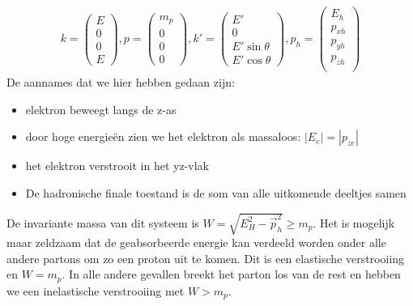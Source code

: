 \documentclass[../main.tex]{subfiles}
\begin{document}
\begin{equation}
    \begin{aligned}
        \label{eq:4_momenta_dis}
        k=
        \begin{pmatrix}
            E\\
            0\\
            0\\
            E
        \end{pmatrix},
        p=
        \begin{pmatrix}
            m_p\\
            0\\
            0\\
            0
        \end{pmatrix},
        k'=
        \begin{pmatrix}
            E'\\
            0\\
            E'\sin\theta\\
            E'\cos\theta
        \end{pmatrix},
        p_h=
        \begin{pmatrix}
            E_h\\
            p_{xh}\\
            p_{yh}\\
            p_{zh}\\
        \end{pmatrix}
    \end{aligned}
\end{equation}
De aannames dat we hier hebben gedaan zijn:
\begin{itemize}
    \item elektron beweegt langs de z-as
    \item door hoge energieën zien we het elektron als massaloos: $|E_e|=|p_{ze}|$
    \item het elektron verstrooit in het yz-vlak
    \item De hadronische finale toestand is de som van alle uitkomende deeltjes samen
\end{itemize}
De invariante massa van dit systeem is $W=\sqrt{E_H^2-\vec{p}^2_h}\geq m_p$. Het is mogelijk maar zeldzaam dat de geabsorbeerde energie kan verdeeld worden onder alle andere partons om zo een proton uit te komen. Dit is een elastische verstrooiing en $W=m_p$. In alle andere gevallen breekt het parton los van de rest en hebben we een inelastische verstrooiing met $W>m_p$.\\
\end{document}
